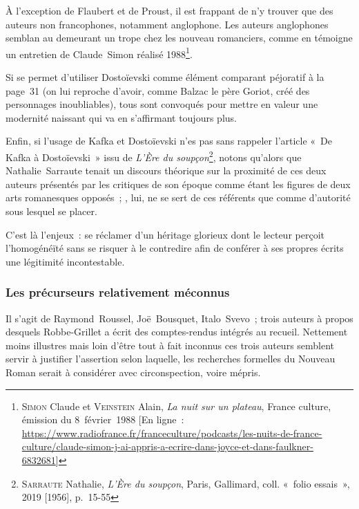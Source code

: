\documentclass[12pt, a4paper]{article}
\begin{document}
À l'exception de Flaubert et de Proust, il est frappant de n'y trouver que des auteurs non francophones, notamment anglophone. Les auteurs anglophones semblan au demeurant un trope chez les nouveau romanciers, comme en témoigne un entretien de Claude~Simon réalisé 1988\footnote{\textsc{Simon} Claude et \textsc{Veinstein} Alain, \textit{La nuit sur un plateau}, France culture, émission du 8~février~1988 [En ligne~: \href{https://www.radiofrance.fr/franceculture/podcasts/les-nuits-de-france-culture/claude-simon-j-ai-appris-a-ecrire-dans-joyce-et-dans-faulkner-6832681}{https://www.radiofrance.fr/franceculture/podcasts/les-nuits-de-france-culture/claude-simon-j-ai-appris-a-ecrire-dans-joyce-et-dans-faulkner-6832681}]}.

Si \robbe{} se permet d'utiliser Dostoïevski comme élément comparant péjoratif à la page~31 (on lui reproche d'avoir, comme Balzac le père Goriot, créé des personnages inoubliables), tous sont convoqués pour mettre en valeur une modernité naissant qui va en s'affirmant toujours plus.

Enfin, si l'usage de Kafka et Dostoïevski n'es pas sans rappeler l'article «~De Kafka à Dostoïevski~» issu de \textit{L'Ère du soupçon}\footnote{\textsc{Sarraute} Nathalie, \textit{L'Ère du soupçon}, Paris, Gallimard, coll. «~folio essais~», 2019 [1956], p.~15-55
}, notons qu'alors que Nathalie~Sarraute tenait un discours théorique sur la proximité de ces deux auteurs présentés par les critiques de son époque comme étant les figures de deux arts romanesques opposés~; \robbe, lui, ne se sert de ces référents que comme d'autorité sous  lesquel se placer.

C'est là l'enjeux~: se réclamer d'un héritage glorieux dont le lecteur perçoit l'homogénéïté sans se risquer à le contredire afin de conférer à ses propres écrits une légitimité incontestable.

\subsubsection{Les précurseurs relativement méconnus}
Il s'agit de Raymond~Roussel, Joë~Bousquet, Italo~Svevo~; trois auteurs à propos desquels Robbe-Grillet a écrit des comptes-rendus intégrés au recueil. Nettement moins illustres mais loin d'être tout à fait inconnus ces trois auteurs semblent servir à justifier l'assertion selon laquelle, les recherches formelles du Nouveau Roman serait à considérer avec circonspection, voire mépris.
\end{document}
